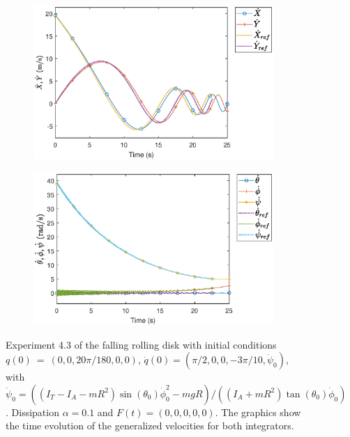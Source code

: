 \documentclass{aims}
\numberwithin{equation}{section}
\theoremstyle{definition}
\begin{document}
\begin{figure}
  \centering
  \begin{subfigure}[b]{0.75\textwidth}
    \centering
    \includegraphics[width=\textwidth]{fig/43XdotYdot.eps}
  \end{subfigure}
  \par\bigskip
  \begin{subfigure}[b]{0.75\textwidth}
    \centering
    \includegraphics[width=\textwidth]{fig/43thetadotphidotpsidot.eps}
  \end{subfigure}
  \caption{Experiment 4.3 of the falling rolling disk with initial conditions $q(0)~=~(0,0,20\pi/180,0,0)$, $\dot{q}(0) = (\pi/2,0,0,-3\pi/10,\dot{\psi}_0)$, with $\dot{\psi}_0 = ((I_T - I_A - m R^2) \sin(\theta_0) \dot{\phi}_0^2 - m g R)/((I_A + m R^2) \tan(\theta_0) \dot{\phi}_0)$. Dissipation $\alpha = 0.1$ and $F(t) = (0,0,0,0,0)$. The graphics show the time evolution of the generalized velocities for both integrators.}
  \label{fig:disco_experimento_4_3_2}
\end{figure}
\end{document}
